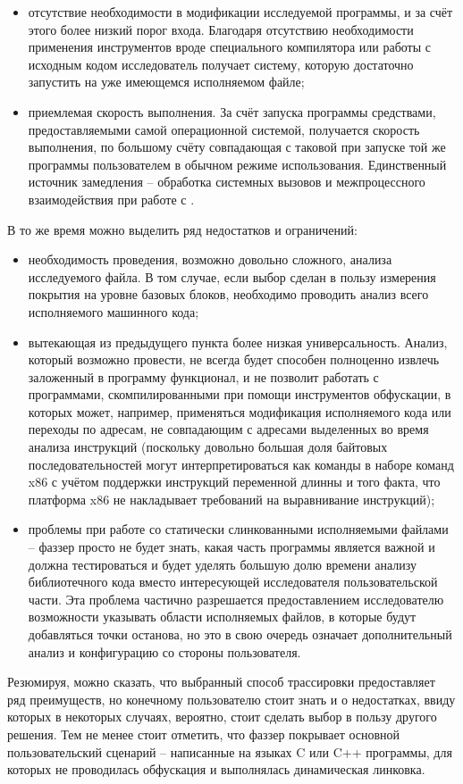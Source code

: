 \begin{itemize}
	\item отсутствие необходимости в модификации исследуемой программы, и за счёт этого более низкий порог входа. Благодаря отсутствию необходимости применения инструментов вроде специального компилятора или работы с исходным кодом исследователь получает систему, которую достаточно запустить на уже имеющемся исполняемом файле;
	
	\item приемлемая скорость выполнения. За счёт запуска программы средствами, предоставляемыми самой операционной системой, получается скорость выполнения, по большому счёту совпадающая с таковой при запуске той же программы пользователем в обычном режиме использования. Единственный источник замедления -- обработка системных вызовов и межпроцессного взаимодействия при работе с .
\end{itemize}

В то же время можно выделить ряд недостатков и ограничений:

\begin{itemize}
	\item необходимость проведения, возможно довольно сложного, анализа исследуемого файла. В том случае, если выбор сделан в пользу измерения покрытия на уровне базовых блоков, необходимо проводить анализ всего исполняемого машинного кода;
	
	\item вытекающая из предыдущего пункта более низкая универсальность. Анализ, который возможно провести, не всегда будет способен полноценно извлечь заложенный в программу функционал, и не позволит работать с программами, скомпилированными при помощи инструментов обфускации, в которых может, например, применяться модификация исполняемого кода или переходы по адресам, не совпадающим с адресами выделенных во время анализа инструкций (поскольку довольно большая доля байтовых последовательностей могут интерпретироваться как команды в наборе команд x86 с учётом поддержки инструкций переменной длинны и того факта, что платформа x86 не накладывает требований на выравнивание инструкций);
	
	\item проблемы при работе со статически слинкованными исполняемыми файлами -- фаззер просто не будет знать, какая часть программы является важной и должна тестироваться и будет уделять большую долю времени анализу библиотечного кода вместо интересующей исследователя пользовательской части. Эта проблема частично разрешается предоставлением исследователю возможности указывать области исполняемых файлов, в которые будут добавляться точки останова, но это в свою очередь означает дополнительный анализ и конфигурацию со стороны пользователя.
\end{itemize}

Резюмируя, можно сказать, что выбранный способ трассировки предоставляет ряд преимуществ, но конечному пользователю стоит знать и о недостатках, ввиду которых в некоторых случаях, вероятно, стоит сделать выбор в пользу другого решения. Тем не менее стоит отметить, что фаззер покрывает основной пользовательский сценарий -- написанные на языках C или C++ программы, для которых не проводилась обфускация и выполнялась динамическая линковка.